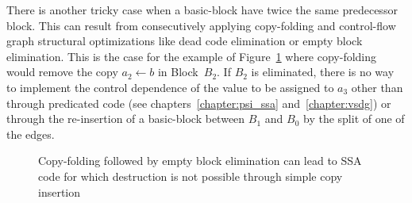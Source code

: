 There is another tricky case when a basic-block have twice the same predecessor block. This can result from consecutively applying copy-folding and control-flow graph structural optimizations like dead code elimination or empty block elimination. This is the case for the example of Figure~\ref{fig:alternative_ssa_destruction:doublepreds} where copy-folding would remove the copy $a_2\gets b$ in Block~$B_2$. If $B_2$ is eliminated, there is no way to implement the control dependence of the value to be assigned to $a_3$ other than through predicated code (see chapters~\ref{chapter:psi_ssa} and~\ref{chapter:vsdg}) or through the re-insertion of a basic-block between $B_1$ and $B_0$ by the split of one of the edges.

\begin{figure}[h]
\hfill
{}\hfill
{}\caption{\label{fig:alternative_ssa_destruction:doublepreds} Copy-folding followed by empty block elimination can lead to SSA code for which destruction is not possible through simple copy insertion}
\end{figure}


